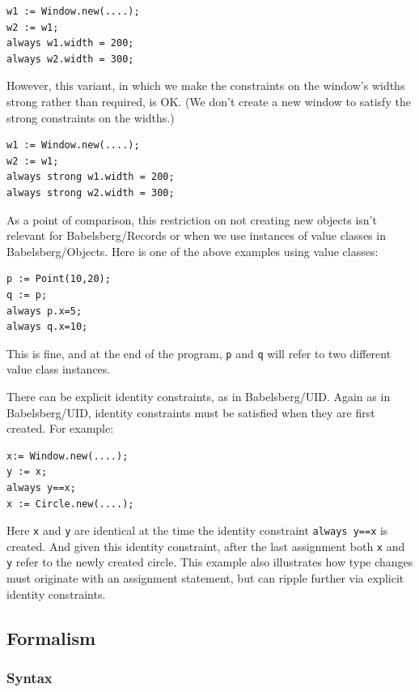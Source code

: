 \documentclass{article}
\begin{document}
\begin{verbatim}
w1 := Window.new(....);
w2 := w1;
always w1.width = 200;
always w2.width = 300;
\end{verbatim}

However, this variant, in which we make the constraints on the
window's widths strong rather than required, is OK.  (We don't create
a new window to satisfy the strong constraints on the widths.)

\begin{verbatim}
w1 := Window.new(....);
w2 := w1;
always strong w1.width = 200;
always strong w2.width = 300;
\end{verbatim}

As a point of comparison, this restriction on not creating new objects
isn't relevant for Babelsberg/Records or when we use instances of
value classes in Babelsberg/Objects.
Here is one of the above examples using value classes:

\begin{verbatim}
p := Point(10,20);
q := p;
always p.x=5;
always q.x=10;
\end{verbatim}

This is fine, and at the end of the program, \verb|p| and \verb|q|
will refer to two different value class instances.

There can be explicit identity constraints, as in Babelsberg/UID\@.
Again as in Babelsberg/UID, identity constraints must be satisfied
when they are first created.  For example:
\begin{verbatim}
x:= Window.new(....);
y := x;
always y==x;
x := Circle.new(....);
\end{verbatim}


Here \verb|x| and \verb|y| are identical at the time the identity
constraint \verb|always y==x| is created.  And given this identity
constraint, after the last assignment both \verb|x| and \verb|y| refer
to the newly created circle.  This example also illustrates how type
changes must originate with an assignment statement, but can ripple
further via explicit identity constraints.

\subsection{Formalism}

\subsubsection{Syntax}
\end{document}
